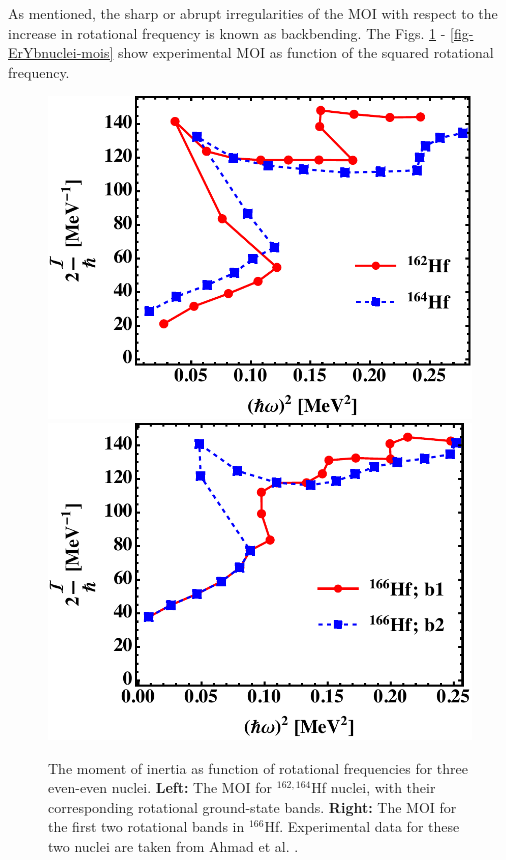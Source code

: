 As mentioned, the sharp or abrupt irregularities of the MOI with respect to the increase in rotational frequency is known as backbending. The Figs. \ref{fig-hfNuclei-mois} - \ref{fig-ErYbnuclei-mois} show experimental MOI as function of the squared rotational frequency.
\begin{figure}
    \centering
    \includegraphics[scale=0.51]{Chapters/Figures/mois_Hf162-164.pdf}
    \includegraphics[scale=0.52]{Chapters/Figures/mois_Hf166.pdf}
    \caption{The moment of inertia as function of rotational frequencies for three even-even nuclei. \textbf{Left:} The MOI for $^{162,164}$Hf nuclei, with their corresponding rotational ground-state bands. \textbf{Right:} The MOI for the first two rotational bands in $^{166}$Hf. Experimental data for these two nuclei are taken from Ahmad et al. \cite{ahmad2021backbending}.}
    \label{fig-hfNuclei-mois}
\end{figure}
